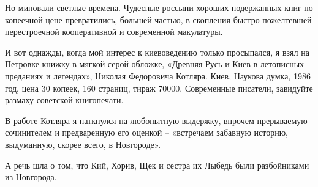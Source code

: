 Но миновали светлые времена. Чудесные россыпи хороших подержанных книг по копеечной цене превратились, большей частью, в скопления быстро пожелтевшей перестроечной кооперативной и современной макулатуры.

И вот однажды, когда мой интерес к киевоведению только просыпался, я взял на Петровке книжку в мягкой серой обложке, «Древняя Русь и Киев в летописных преданиях и легендах», Николая Федоровича Котляра. Киев, Наукова думка, 1986 год, цена 30 копеек, 160 страниц, тираж 70000. Современные писатели, завидуйте размаху советской книгопечати.

В работе Котляра я наткнулся на любопытную выдержку, впрочем прерываемую сочинителем и предваренную его оценкой – «встречаем забавную историю, выдуманную, скорее всего, в Новгороде».

А речь шла о том, что Кий, Хорив, Щек и сестра их Лыбедь были разбойниками из Новгорода.
